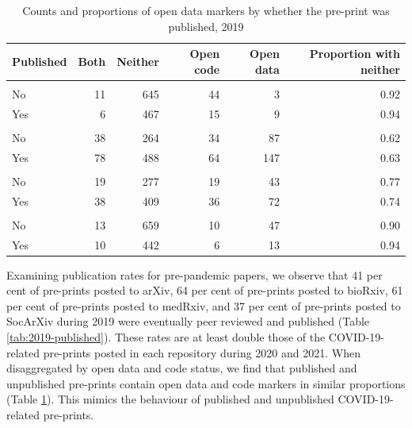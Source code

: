 \documentclass[
]{article}
\begin{document}
\begin{table}

\caption{\label{tab:2019-open-publishing}Counts and proportions of open data markers by whether the pre-print was published, 2019}
\centering
\begin{tabular}[t]{lrrrrr}
\toprule
Published & Both & Neither & Open code & Open data & Proportion with neither\\
\midrule
\addlinespace[0.3em]
\multicolumn{6}{l}{\textbf{arXiv}}\\
\hspace{1em}No & 11 & 645 & 44 & 3 & 0.92\\
\hspace{1em}Yes & 6 & 467 & 15 & 9 & 0.94\\
\addlinespace[0.3em]
\multicolumn{6}{l}{\textbf{bioRxiv}}\\
\hspace{1em}No & 38 & 264 & 34 & 87 & 0.62\\
\hspace{1em}Yes & 78 & 488 & 64 & 147 & 0.63\\
\addlinespace[0.3em]
\multicolumn{6}{l}{\textbf{medRxiv}}\\
\hspace{1em}No & 19 & 277 & 19 & 43 & 0.77\\
\hspace{1em}Yes & 38 & 409 & 36 & 72 & 0.74\\
\addlinespace[0.3em]
\multicolumn{6}{l}{\textbf{socArXiv}}\\
\hspace{1em}No & 13 & 659 & 10 & 47 & 0.90\\
\hspace{1em}Yes & 10 & 442 & 6 & 13 & 0.94\\
\bottomrule
\end{tabular}
\end{table}

Examining publication rates for pre-pandemic papers, we observe that 41 per cent of pre-prints posted to arXiv, 64 per cent of pre-prints posted to bioRxiv, 61 per cent of pre-prints posted to medRxiv, and 37 per cent of pre-prints posted to SocArXiv during 2019 were eventually peer reviewed and published (Table \ref{tab:2019-published}). These rates are at least double those of the COVID-19-related pre-prints posted in each repository during 2020 and 2021. When disaggregated by open data and code status, we find that published and unpublished pre-prints contain open data and code markers in similar proportions (Table \ref{tab:2019-open-publishing}). This mimics the behaviour of published and unpublished COVID-19-related pre-prints.
\end{document}
